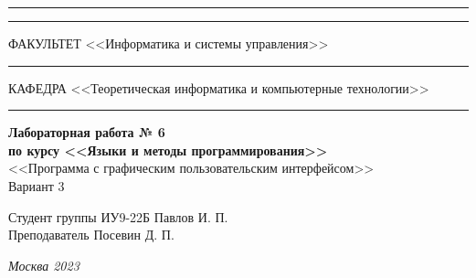 \documentclass[a4paper, 14pt]{extarticle}
\begin{document}
\begin{titlepage}
\vspace{-25pt}
\hspace{-35pt}\rule{\textwidth}{2.3pt}

\vspace*{-20.3pt}
\hspace{-35pt}\rule{\textwidth}{0.4pt}

\vspace{1.5ex}
\hspace{-35pt} \noindent \small ФАКУЛЬТЕТ\hspace{80pt} <<Информатика и системы управления>>

\vspace*{-16pt}
\hspace{47pt}\rule{0.83\textwidth}{0.4pt}

\vspace{0.5ex}
\hspace{-35pt} \noindent \small КАФЕДРА\hspace{50pt} <<Теоретическая информатика и компьютерные технологии>>

\vspace*{-16pt}
\hspace{30pt}\rule{0.866\textwidth}{0.4pt}
  
\vspace{11em}

\begin{center}
\Large {\bf Лабораторная работа № 6} \\ 
\large {\bf по курсу <<Языки и методы программирования>>} \\
\large <<Программа с графическим пользовательским интерфейсом>> \\
\large Вариант 3
\end{center}\normalsize

\vspace{8em}


\begin{flushright}
  {Студент группы ИУ9-22Б Павлов И. П. \hspace*{15pt}\\ 
  \vspace{2ex}
  Преподаватель Посевин Д. П.\hspace*{15pt}}
\end{flushright}

\bigskip

\vfill
 

\begin{center}
\textsl{Москва 2023}
\end{center}
\end{titlepage}
\end{document}

